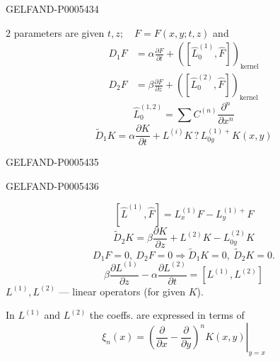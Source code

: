 \begin{GelfandAdjacentEvidence}{GELFAND-P000543}{4}

2 parameters are given \(t,z;\quad F=F(x,y;t,z)\) and
\begin{align}
D_1F&=\alpha\frac{\partial F}{\partial t}
+([\hat L_0^{(1)},\hat F])_{\text{kernel}}\tag{10}\\
D_2F&=\beta\frac{\partial F}{\partial z}
+([\hat L_0^{(2)},\hat F])_{\text{kernel}}\tag{11}
\end{align}
\[
\hat L_0^{(1,2)}=\sum C^{(n)}\frac{\partial^n}{\partial x^n}
\]
\[
\tilde D_1K=\alpha\frac{\partial K}{\partial t}
+L^{(i)}K\mathbin{?}L_{0y}^{(1)+}K(x,y)\tag{12}
\]
\end{GelfandAdjacentEvidence}
\begin{GelfandAdjacentEvidence}{GELFAND-P000543}{5}

\end{GelfandAdjacentEvidence}
\begin{GelfandAdjacentEvidence}{GELFAND-P000543}{6}

\end{GelfandAdjacentEvidence}

\[
[\hat L^{(1)},\hat F]=L_x^{(1)}F-L_y^{(1)+}F
\]
\[
\tilde D_2K=\beta\frac{\partial K}{\partial z}
+L^{(2)}K-L_{0y}^{(2)}K\tag{13}
\]
\[
\boxed{D_1F=0,\ D_2F=0\Longrightarrow\tilde D_1K=0,\ \tilde D_2K=0.}\tag{14}
\]
\[
\boxed{\beta\frac{\partial L^{(1)}}{\partial z}
-\alpha\frac{\partial L^{(2)}}{\partial t}
=[L^{(1)},L^{(2)}]}\tag{15}
\]
\(L^{(1)},L^{(2)}\) — linear operators (for given \(K\)).

In \(L^{(1)}\) and \(L^{(2)}\) the coeffs. are expressed in terms of
\[
\xi_n(x)=\left.\left(\frac{\partial}{\partial x}
-\frac{\partial}{\partial y}\right)^n K(x,y)\right|_{y=x}
\]


